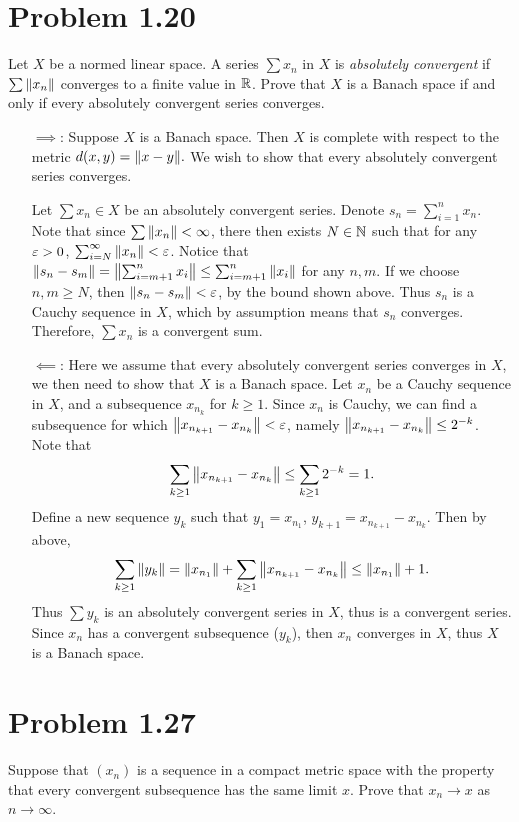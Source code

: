 \section{Problem 1.20}
Let $X$ be a normed linear space. A series $\sum x_n$ in $X$ is \textit{absolutely convergent} if $\sum \norm{x_n}$ converges to a finite value in $\mathbb{R}$. Prove that $X$ is a Banach space if and only if every absolutely convergent series converges.
\partbreak

\begin{solution}

\begin{itemize}
    \item [\underline{$\implies$}:] Suppose $X$ is a Banach space. Then $X$ is complete with respect to the metric $d(x, y) = \norm{x - y}.$ We wish to show that every absolutely convergent series converges.\par

    Let $\sum x_n \in X$ be an absolutely convergent series. Denote $s_n = \sum_{i = 1}^n x_n$. Note that since $\sum \norm{x_n} < \infty$, there then exists $N \in \mathbb{N}$ such that for any $\varepsilon > 0$, $\sum_{i = N}^\infty \norm{x_n} < \varepsilon$. Notice that $\norm{s_n - s_m} = \norm{\sum_{i = m+1}^n x_i} \leq \sum_{i = m+1}^n\norm{x_i}$ for any $n, m$. If we choose $n, m \geq N$, then $\norm{s_n - s_m} < \varepsilon$, by the bound shown above. Thus $s_n$ is a Cauchy sequence in $X$, which by assumption means that $s_n$ converges. Therefore, $\sum x_n$ is a convergent sum. 

    \item [\underline{$\impliedby$}:] Here we assume that every absolutely convergent series converges in $X$, we then need to show that $X$ is a Banach space. Let $x_n$ be a Cauchy sequence in $X$, and a subsequence $x_{n_k}$ for $k \geq 1$. Since $x_n$ is Cauchy, we can find a subsequence for which $\norm{x_{n_{k+1}} - x_{n_k}} < \varepsilon$, namely $\norm{x_{n_{k+1}} - x_{n_k}} \leq 2^{-k}$. Note that 
    \[
    \sum_{k \geq 1} \norm{x_{n_{k+1}} - x_{n_k}} \leq \sum_{k \geq 1} 2^{-k} = 1.
    \]
    Define a new sequence $y_k$ such that $y_1 = x_{n_1}$, $y_{k+1} = x_{n_{k+1}} - x_{n_k}$. Then by above, 
    \[
    \sum_{k \geq 1}\norm{y_k} = \norm{x_{n_1}} + \sum_{k \geq 1} \norm{x_{n_{k+1}} - x_{n_k}} \leq \norm{x_{n_1}} + 1.
    \]
    Thus $\sum y_k$ is an absolutely convergent series in $X$, thus is a convergent series. Since $x_n$ has a convergent subsequence ($y_k$), then $x_n$ converges in $X$, thus $X$ is a Banach space. 
\end{itemize}
\end{solution}

\newpage
\section{Problem 1.27}
Suppose that $(x_n)$ is a sequence in a compact metric space with the property that every convergent subsequence has the same limit $x$. Prove that $x_n \rightarrow x$ as $n \rightarrow \infty$.
\partbreak
\begin{solution}
    
\end{solution}
